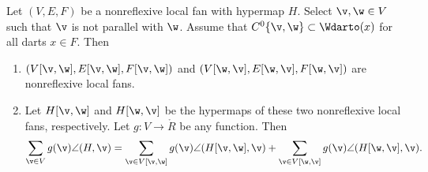 \begin{lemma}[slicing]\label{lemma:slice} Let
$(V,E,F)$ be a nonreflexive local fan with hypermap $H$.  Select $\v,\w\in V$
such that
 $\v$ is not parallel with $\w$.
Assume that $C^0\{\v,\w\}\subset
\Wdarto(x)$ for all darts $x\in F$.  Then
\begin{enumerate}\wasitemize 
\item $(V[\v,\w],E[\v,\w],F[\v,\w])$ and
$(V[\w,\v],E[\w,\v],F[\w,\v])$ are nonreflexive local fans.
\item Let $H[\v,\w]$ and $H[\w,\v]$ be the hypermaps of these two
  nonreflexive local fans, respectively.  Let $g:V\to\ring{R}$ be any
  function.  Then
\[ 
  \sum_{\v\in V} g(\v)\angle(H,\v) 
  = \sum_{\v\in V[\v,\w]}g(\v)\angle(H[\v,\w],\v) 
  + \sum_{\v\in V[\w,\v]}g(\v)\angle(H[\w,\v],\v).
\] 
\end{enumerate}\wasitemize 
\end{lemma}
%
%

